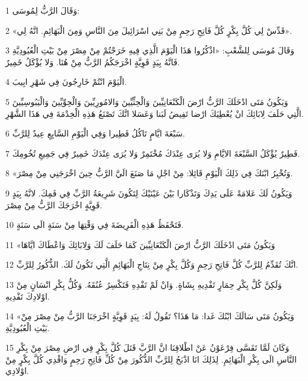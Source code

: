 \par 1 وَقَالَ الرَّبُّ لِمُوسَى:
\par 2 «قَدِّسْ لِي كُلَّ بِكْرٍ كُلَّ فَاتِحِ رَحِمٍ مِنْ بَنِي اسْرَائِيلَ مِنَ النَّاسِ وَمِنَ الْبَهَائِمِ. انَّهُ لِي».
\par 3 وَقَالَ مُوسَى لِلشَّعْبِ: «اذْكُرُوا هَذَا الْيَوْمَ الَّذِي فِيهِ خَرَجْتُمْ مِنْ مِصْرَ مِنْ بَيْتِ الْعُبُودِيَّةِ فَانَّهُ بِيَدٍ قَوِيَّةٍ اخْرَجَكُمُ الرَّبُّ مِنْ هُنَا. وَلا يُؤْكَلُ خَمِيرٌ.
\par 4 الْيَوْمَ انْتُمْ خَارِجُونَ فِي شَهْرِ ابِيبَ.
\par 5 وَيَكُونُ مَتَى ادْخَلَكَ الرَّبُّ ارْضَ الْكَنْعَانِيِّينَ وَالْحِثِّيِّينَ وَالامُورِيِّينَ وَالْحِوِّيِّينَ وَالْيَبُوسِيِّينَ الَّتِي حَلَفَ لِابَائِكَ انْ يُعْطِيَكَ ارْضا تَفِيضُ لَبَنا وَعَسَلا انَّكَ تَصْنَعُ هَذِهِ الْخِدْمَةَ فِي هَذَا الشَّهْرِ.
\par 6 سَبْعَةَ ايَّامٍ تَاكُلُ فَطِيرا وَفِي الْيَوْمِ السَّابِعِ عِيدٌ لِلرَّبِّ.
\par 7 فَطِيرٌ يُؤْكَلُ السَّبْعَةَ الايَّامِ وَلا يُرَى عِنْدَكَ مُخْتَمِرٌ وَلا يُرَى عِنْدَكَ خَمِيرٌ فِي جَمِيعِ تُخُومِكَ.
\par 8 «وَتُخْبِرُ ابْنَكَ فِي ذَلِكَ الْيَوْمِ قَائِلا: مِنْ اجْلِ مَا صَنَعَ الَيَّ الرَّبُّ حِينَ اخْرَجَنِي مِنْ مِصْرَ.
\par 9 وَيَكُونُ لَكَ عَلامَةً عَلَى يَدِكَ وَتَذْكَارا بَيْنَ عَيْنَيْكَ لِتَكُونَ شَرِيعَةُ الرَّبِّ فِي فَمِكَ. لانَّهُ بِيَدٍ قَوِيَّةٍ اخْرَجَكَ الرَّبُّ مِنْ مِصْرَ.
\par 10 فَتَحْفَظُ هَذِهِ الْفَرِيضَةَ فِي وَقْتِهَا مِنْ سَنَةٍ الَى سَنَةٍ.
\par 11 «وَيَكُونُ مَتَى ادْخَلَكَ الرَّبُّ ارْضَ الْكَنْعَانِيِّينَ كَمَا حَلَفَ لَكَ وَلِابَائِكَ وَاعْطَاكَ ايَّاهَا
\par 12 انَّكَ تُقَدِّمُ لِلرَّبِّ كُلَّ فَاتِحِ رَحِمٍ وَكُلَّ بِكْرٍ مِنْ نِتَاجِ الْبَهَائِمِ الَّتِي تَكُونُ لَكَ. الذُّكُورُ لِلرَّبِّ.
\par 13 وَلَكِنَّ كُلَّ بِكْرِ حِمَارٍ تَفْدِيهِ بِشَاةٍ. وَانْ لَمْ تَفْدِهِ فَتَكْسِرُ عُنُقَهُ. وَكُلُّ بِكْرِ انْسَانٍ مِنْ اوْلادِكَ تَفْدِيهِ.
\par 14 «وَيَكُونُ مَتَى سَالَكَ ابْنُكَ غَدا: مَا هَذَا؟ تَقُولُ لَهُ: بِيَدٍ قَوِيَّةٍ اخْرَجَنَا الرَّبُّ مِنْ مِصْرَ مِنْ بَيْتِ الْعُبُودِيَّةِ.
\par 15 وَكَانَ لَمَّا تَقَسَّى فِرْعَوْنُ عَنْ اطْلاقِنَا انَّ الرَّبَّ قَتَلَ كُلَّ بِكْرٍ فِي ارْضِ مِصْرَ مِنْ بِكْرِ النَّاسِ الَى بِكْرِ الْبَهَائِمِ. لِذَلِكَ انَا اذْبَحُ لِلرَّبِّ الذُّكُورَ مِنْ كُلِّ فَاتِحِ رَحِمٍ وَافْدِي كُلَّ بِكْرٍ مِنْ اوْلادِي.

